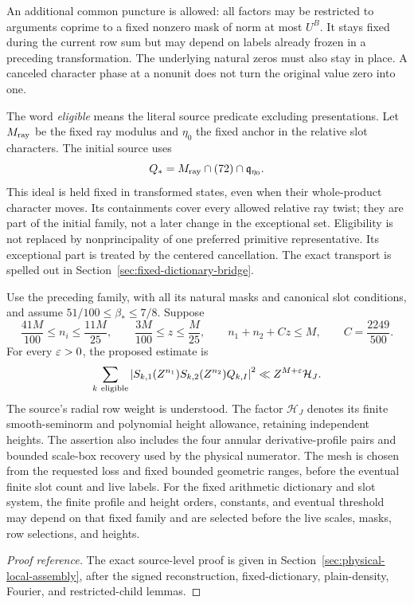 An additional common puncture is allowed: all factors may be restricted
to arguments coprime to a fixed nonzero mask of norm at most $U^B$.
It stays fixed during the current row sum but may depend on labels
already frozen in a preceding transformation. The underlying natural
zeros must also stay in place. A canceled character phase at a nonunit
does not turn the original value zero into one.

The word \emph{eligible} means the literal source predicate excluding
 presentations. Let $M_{\rm ray}$ be the fixed
ray modulus and $\eta_0$ the fixed anchor in the relative slot characters.
The initial source uses
\[
 Q_* = M_{\rm ray}\cap(72)\cap\mathfrak q_{\eta_0}.
\]
This ideal is held fixed in transformed states, even when their
whole-product character moves. Its containments cover every allowed
relative ray twist; they are part of the initial family, not a later
change in the exceptional set. Eligibility is not replaced by
nonprincipality of one preferred primitive representative. Its exceptional
part is treated by the centered cancellation. The exact transport is
spelled out in Section~\ref{sec:fixed-dictionary-bridge}.

\begin{proposition}\label{hyp:local}
Use the preceding family, with all its natural masks and canonical slot
conditions, and assume $51/100\le\beta_*\le7/8$. Suppose
\begin{equation}\label{eq:window}
 \frac{41M}{100}\le n_i\le\frac{11M}{25},\qquad
 \frac{3M}{100}\le z\le\frac M{25},\qquad
 n_1+n_2+Cz\le M,\qquad C=\frac{2249}{500}.
\end{equation}
For every $\varepsilon>0$, the proposed estimate is
\begin{equation}\label{eq:moment}
 \sum_{k\ {\rm eligible}}
 \left|S_{k,1}(Z^{n_1})S_{k,2}(Z^{n_2})Q_{k,I}\right|^2
 \ll Z^{M+\varepsilon}\mathcal H_J.
\end{equation}
The source's radial row weight is understood. The factor $\mathcal H_J$
denotes its finite smooth-seminorm and polynomial height allowance,
retaining independent heights. The assertion also includes the four
annular derivative-profile pairs and bounded scale-box recovery used by
the physical numerator. The mesh is chosen from the requested loss and
fixed bounded geometric ranges, before the eventual finite slot count and
live labels. For the fixed arithmetic dictionary and slot system, the
finite profile and height orders, constants, and eventual threshold may
depend on that fixed family and are selected before the live scales,
masks, row selections, and heights.
\end{proposition}
\begin{proof}[Proof reference]
The exact source-level proof is given in
Section~\ref{sec:physical-local-assembly}, after the signed reconstruction,
fixed-dictionary, plain-density, Fourier, and restricted-child lemmas.
\end{proof}

